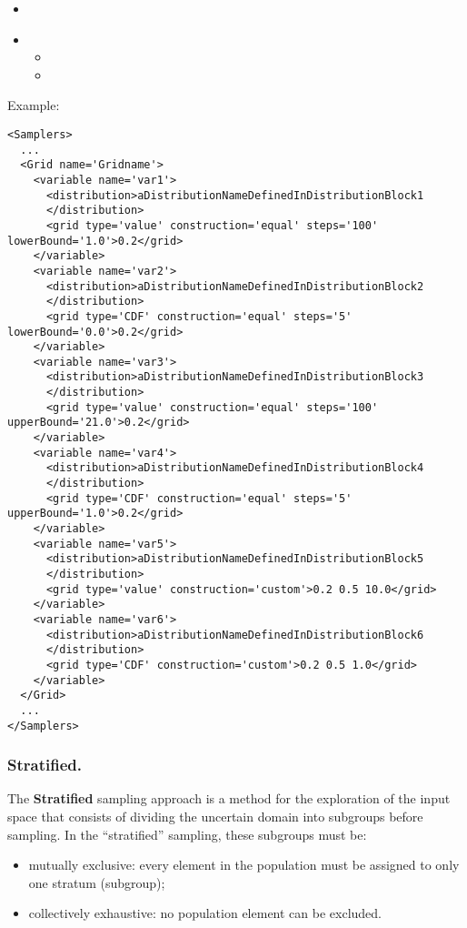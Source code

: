 %
\attrIntro
\begin{itemize}
\itemsep0em
\item \nameDescription
\end{itemize}
\begin{itemize}
\item \variableDescription
 \variableChildrenIntro
 \begin{itemize}
    \item \distributionDescription
    \item \gridDescription
  \end{itemize}
\end{itemize}

Example:
\begin{lstlisting}[style=XML,morekeywords={construction,steps,lowerBound,upperBound}]
<Samplers>
  ...
  <Grid name='Gridname'> 
    <variable name='var1'> 
      <distribution>aDistributionNameDefinedInDistributionBlock1
      </distribution> 
      <grid type='value' construction='equal' steps='100' lowerBound='1.0'>0.2</grid> 
    </variable> 
    <variable name='var2'> 
      <distribution>aDistributionNameDefinedInDistributionBlock2
      </distribution> 
      <grid type='CDF' construction='equal' steps='5' lowerBound='0.0'>0.2</grid> 
    </variable>
    <variable name='var3'> 
      <distribution>aDistributionNameDefinedInDistributionBlock3
      </distribution> 
      <grid type='value' construction='equal' steps='100' upperBound='21.0'>0.2</grid> 
    </variable> 
    <variable name='var4'> 
      <distribution>aDistributionNameDefinedInDistributionBlock4
      </distribution> 
      <grid type='CDF' construction='equal' steps='5' upperBound='1.0'>0.2</grid> 
    </variable>
    <variable name='var5'> 
      <distribution>aDistributionNameDefinedInDistributionBlock5
      </distribution> 
      <grid type='value' construction='custom'>0.2 0.5 10.0</grid> 
    </variable> 
    <variable name='var6'> 
      <distribution>aDistributionNameDefinedInDistributionBlock6
      </distribution> 
      <grid type='CDF' construction='custom'>0.2 0.5 1.0</grid> 
    </variable>
  </Grid>
  ...
</Samplers>
\end{lstlisting}

\subsubsection{Stratified.}
\label{subsubsubsec:Stratified}
The \textbf{Stratified} sampling approach is a method for the exploration of the
input space that consists of dividing the uncertain domain into subgroups before
sampling.
%
In the ``stratified'' sampling, these subgroups must be:
\begin{itemize}
 \item mutually exclusive: every element in the population must be assigned to
   only one stratum (subgroup);
 \item collectively exhaustive: no population element can be excluded.
\end{itemize}

